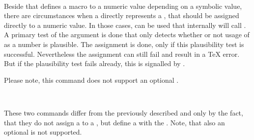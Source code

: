\begin{Declaration}
  \\
\end{Declaration}
%
%
Beside  that
defines a macro to a numeric value depending on a symbolic value, there are
circumstances when a  directly represents a , that should be assigned directly to a numeric value. In those
cases,  can be used that internally will call
. A primary test of the  argument is done
that only detects whether or not usage of  as a number is
plausible. The assignment is done, only if this plausibility test is
successful. Nevertheless the assignment can still fail and result in a \TeX{}
error. But if the plausibility test fails already, this is signalled by
.

Please note, this command does not support an optional
.%
%
%

\begin{Declaration}
  \\
\end{Declaration}
%
%
These two commands differ from the
previously described  and 
only by the fact, that they do not assign a  to a , but define a  with the
. Note, that also an optional 
is not supported.%
%
%

